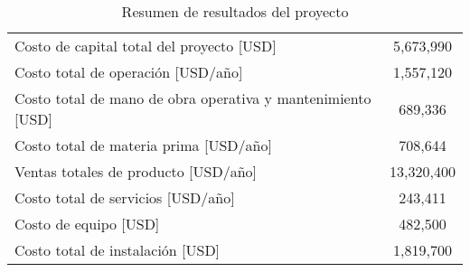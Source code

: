 \begin{table}[H]
    \centering
    \caption{Resumen de resultados del proyecto}
    \label{tab:resultados}
    \begin{tabular}{l|c} \hline 
    Costo de capital total del proyecto  [USD]                               & 5,673,990  \\
    Costo total de operación   [USD/año]                        & 1,557,120   \\
    Costo total de mano de obra operativa y mantenimiento [USD] & 689,336     \\
    Costo total de materia prima   [USD/año]                    & 708,644          \\
    Ventas totales de producto [USD/año]                        & 13,320,400
    
              \\
    Costo total de servicios   [USD/año]                        & 243,411     \\
    Costo de equipo [USD]                                       & 482,500     \\
    Costo total de instalación [USD]                            & 1,819,700 \\ \hline   
    \end{tabular}
\end{table}
